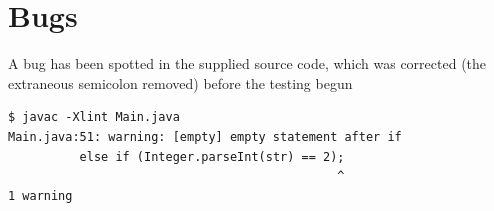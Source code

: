 \documentclass[10pt]{report}
\begin{document}


%
%

\appendix
\chapter{Bugs}

A bug has been spotted in the supplied source code, which was corrected (the extraneous semicolon removed) before the testing begun

\begin{verbatim}
$ javac -Xlint Main.java
Main.java:51: warning: [empty] empty statement after if
          else if (Integer.parseInt(str) == 2);
                                              ^
1 warning
\end{verbatim}


%
%



\thispagestyle{fancy}
\end{document}
